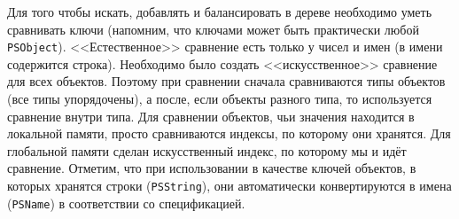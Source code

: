 \documentclass[14pt]{extarticle}
\begin{document}
Для того чтобы искать, добавлять и балансировать в дереве необходимо уметь сравнивать ключи (напомним, что ключами может быть практически любой \texttt{PSObject}). <<Естественное>> сравнение есть только у чисел и имен (в имени содержится строка). Необходимо было создать <<искусственное>> сравнение для всех объектов. Поэтому при сравнении сначала сравниваются типы объектов (все типы упорядочены), а после, если объекты разного типа, то используется сравнение внутри типа. Для сравнении объектов, чьи значения находится в локальной памяти, просто сравниваются индексы, по которому они хранятся. Для глобальной памяти сделан искусственный индекс, по которому мы и идёт сравнение. Отметим, что при использовании в качестве ключей объектов, в которых хранятся строки (\texttt{PSString}), они автоматически конвертируются в имена (\texttt{PSName}) в соответствии со спецификацией.
\end{document}
